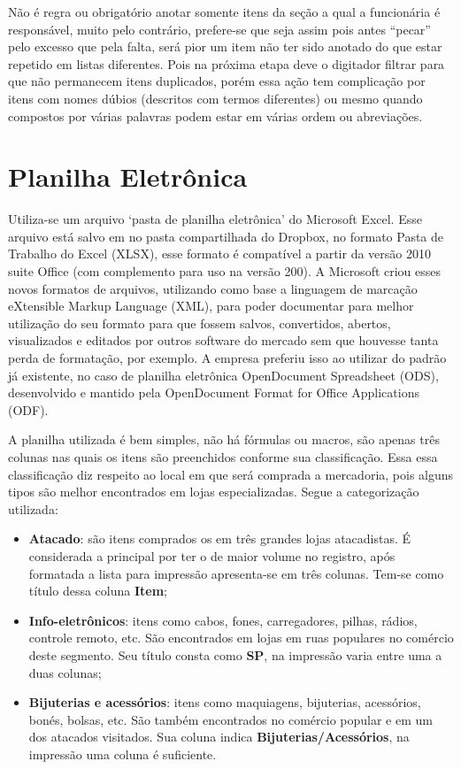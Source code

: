 \documentclass[
	draft,
	12pt,
	openright,
	oneside, %
	a4paper,
	chapter=TITLE,
	section=TITLE,
	english,
	brazil %
	]{abntex2-udesc}
\begin{document}
Não é regra ou obrigatório anotar somente itens da seção a qual a funcionária é responsável, muito pelo contrário, prefere-se que seja assim pois antes ``pecar'' pelo excesso que pela falta, será pior um item não ter sido anotado do que estar repetido em listas diferentes. Pois na próxima etapa deve o digitador filtrar para que não permanecem itens duplicados, porém essa ação tem complicação por itens com nomes dúbios (descritos com termos diferentes) ou mesmo quando compostos por várias palavras podem estar em várias ordem ou abreviações.

\section{Planilha Eletrônica}

Utiliza-se um arquivo `pasta de planilha eletrônica' do Microsoft Excel. Esse arquivo está salvo em no pasta compartilhada do Dropbox, no formato Pasta de Trabalho do Excel (XLSX), esse formato é compatível a partir da versão 2010 suite Office (com complemento para uso na versão 200). A Microsoft criou esses novos formatos de arquivos, utilizando como base a linguagem de marcação eXtensible Markup Language (XML), para poder documentar para melhor utilização do seu formato para que fossem salvos, convertidos, abertos, visualizados e editados por outros software do mercado sem que houvesse tanta perda de formatação, por exemplo. A empresa preferiu isso ao utilizar do padrão já existente, no caso de planilha eletrônica OpenDocument Spreadsheet (ODS), desenvolvido e mantido pela OpenDocument Format for Office Applications (ODF).

A planilha utilizada é bem simples, não há fórmulas ou macros, são apenas três colunas nas quais os itens são preenchidos conforme sua classificação. Essa essa classificação diz respeito ao local em que será comprada a mercadoria, pois alguns tipos são melhor encontrados em lojas especializadas. Segue a categorização utilizada:

\begin{itemize}
\item \textbf{Atacado}: são itens comprados os em três grandes lojas atacadistas. É considerada a principal por ter o de maior volume no registro, após formatada a lista para impressão apresenta-se em três colunas. Tem-se como título dessa coluna \textbf{Item};
\item \textbf{Info-eletrônicos}: itens como cabos, fones, carregadores, pilhas, rádios, controle remoto, etc. São encontrados em lojas em ruas populares no comércio deste segmento. Seu título consta como \textbf{SP}, na impressão varia entre uma a duas colunas;
\item \textbf{Bijuterias e acessórios}: itens como maquiagens, bijuterias, acessórios, bonés, bolsas, etc. São também encontrados no comércio popular e em um dos atacados visitados. Sua coluna indica \textbf{Bijuterias/Acessórios}, na impressão uma coluna é suficiente.
\end{itemize}
\end{document}
